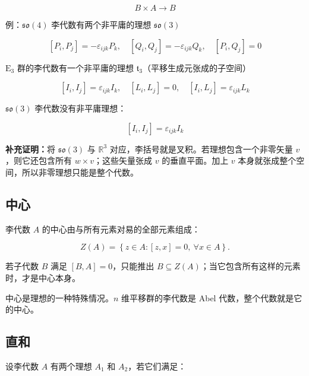 \begin{equation}
B\times A\to B
\end{equation}

例：$\mathfrak{so}\left(4\right)$ 李代数有两个非平庸的理想 $\mathfrak{so}\left(3\right)$ 

\begin{equation}
\left[P_i,P_j \right]=-\varepsilon_{ijk}P_k,\quad
\left[Q_i,Q_j \right]=-\varepsilon_{ijk}Q_k,\quad
\left[P_i,Q_j \right]=0
\end{equation}

$\mathrm{E}_3$ 群的李代数有一个非平庸的理想 $\mathfrak{t}_3$（平移生成元张成的子空间）

\begin{equation}
\left[I_i,I_j \right]=\varepsilon_{ijk}I_k,\quad
\left[L_i,L_j \right]=0,\quad
\left[I_i,L_j \right]=\varepsilon_{ijk}L_k
\end{equation}

$\mathfrak{so}\left(3\right)$ 李代数没有非平庸理想：

\begin{equation}
\left[I_i,I_j \right]=\varepsilon_{ijk}I_k
\end{equation}

\textbf{补充证明：}将 $\mathfrak{so}\left(3\right)$ 与 $\mathbb{R}^3$ 对应，李括号就是叉积。若理想包含一个非零矢量 $v$，则它还包含所有 $w\times v$；这些矢量张成 $v$ 的垂直平面。加上 $v$ 本身就张成整个空间，所以非零理想只能是整个代数。

\subsection{中心}

李代数 $A$ 的中心由与所有元素对易的全部元素组成：

\begin{equation}
Z\left(A\right)=\left\{z\in A:\left[z,x\right]=0,\ \forall x\in A\right\}.
\end{equation}

若子代数 $B$ 满足 $\left[B,A\right]=0$，只能推出 $B\subseteq Z\left(A\right)$；当它包含所有这样的元素时，才是中心本身。

中心是理想的一种特殊情况。$n$ 维平移群的李代数是 Abel 代数，整个代数就是它的中心。

\subsection{直和}

设李代数 $A$ 有两个理想 $A_1$ 和 $A_2$，若它们满足：

